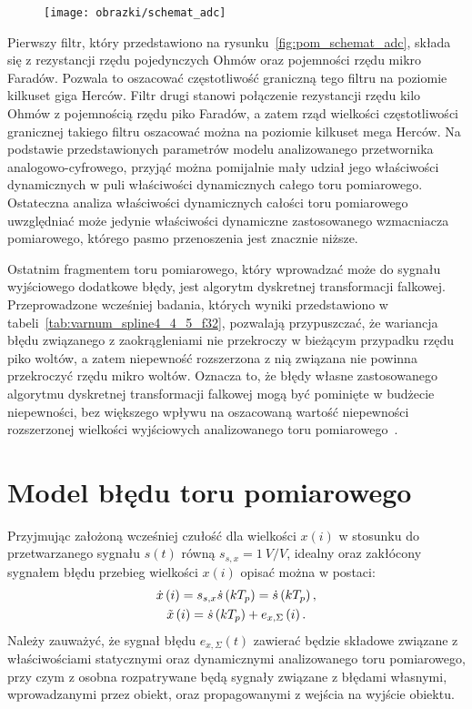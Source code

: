 \begin{figure}[htb!]
\begin{center}
\texttt{[image: obrazki/schemat\_adc]}
\end{center}
\end{figure}

Pierwszy filtr, który przedstawiono na rysunku~\ref{fig:pom_schemat_adc}, składa się z rezystancji rzędu pojedynczych Ohmów oraz pojemności rzędu mikro Faradów. Pozwala to oszacować częstotliwość graniczną tego filtru na poziomie kilkuset giga Herców. Filtr drugi stanowi połączenie rezystancji rzędu kilo Ohmów z pojemnością rzędu piko Faradów, a zatem rząd wielkości częstotliwości granicznej takiego filtru oszacować można na poziomie kilkuset mega Herców. Na podstawie przedstawionych parametrów modelu analizowanego przetwornika analogowo-cyfrowego, przyjąć można pomijalnie mały udział jego właściwości dynamicznych w puli właściwości dynamicznych całego toru pomiarowego. Ostateczna analiza właściwości dynamicznych całości toru pomiarowego uwzględniać może jedynie właściwości dynamiczne zastosowanego wzmacniacza pomiarowego, którego pasmo przenoszenia jest znacznie niższe.

Ostatnim fragmentem toru pomiarowego, który wprowadzać może do sygnału wyjściowego dodatkowe błędy, jest algorytm dyskretnej transformacji falkowej. Przeprowadzone wcześniej badania, których wyniki przedstawiono w tabeli~\ref{tab:varnum_spline4_4_5_f32}, pozwalają przypuszczać, że wariancja błędu związanego z zaokrągleniami nie przekroczy w bieżącym przypadku rzędu piko woltów, a zatem niepewność rozszerzona z nią związana nie powinna przekroczyć rzędu mikro woltów. Oznacza to, że błędy własne zastosowanego algorytmu dyskretnej transformacji falkowej mogą być pominięte w budżecie niepewności, bez większego wpływu na oszacowaną wartość niepewności rozszerzonej wielkości wyjściowych analizowanego toru pomiarowego~\cite{jcgm_guide}.

\section{Model błędu toru pomiarowego}

Przyjmując założoną wcześniej czułość dla wielkości $x(i)$ w stosunku do przetwarzanego sygnału $s(t)$ równą $s_{s,x} = \qty{1}{V \per V}$, idealny oraz zakłócony sygnałem błędu przebieg wielkości $x(i)$ opisać można w postaci:
\begin{gather}
\dot{x} \left(i\right) = s_{s,x} \dot{s} \left(kT_{p}\right) = \dot{s} \left(kT_{p}\right) \label{eq:pom_dwtina_ideal}, \\
\tilde{x} \left(i\right) = \dot{s} \left(kT_{p}\right) + e_{x,\Sigma} \left(i\right) \label{eq:pom_dwtina_real}.
\end{gather}
Należy zauważyć, że sygnał błędu $e_{x,\Sigma}(t)$ zawierać będzie składowe związane z właściwościami statycznymi oraz dynamicznymi analizowanego toru pomiarowego, przy czym z osobna rozpatrywane będą sygnały związane z błędami własnymi, wprowadzanymi przez obiekt, oraz propagowanymi z wejścia na wyjście obiektu.

